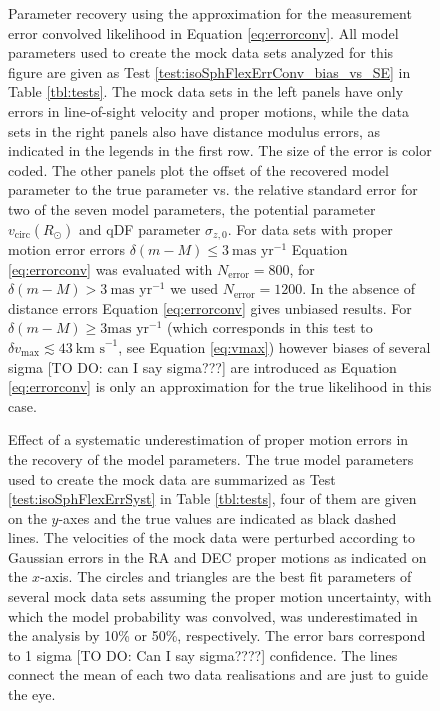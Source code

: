 \begin{figure}
\caption{Parameter recovery using the approximation for the measurement error convolved likelihood in Equation \ref{eq:errorconv}. All model parameters used to create the mock data sets analyzed for this figure are given as Test \ref{test:isoSphFlexErrConv_bias_vs_SE} in Table \ref{tbl:tests}. The mock data sets in the left panels have only errors in line-of-sight velocity and proper motions, while the data sets in the right panels also have distance modulus errors, as indicated in the legends in the first row. The size of the error is color coded. The other panels plot the offset of the recovered model parameter to the true parameter vs. the relative standard error for two of the seven model parameters, the potential parameter $v_\text{circ}(R_\odot)$ and qDF parameter $\sigma_{z,0}$. For data sets with proper motion error errors $\delta(m-M) \leq 3 \ \text{mas yr}^{-1}$ Equation \ref{eq:errorconv} was evaluated with $N_\text{error}=800$, for $\delta(m-M) > 3 \ \text{mas yr}^{-1}$ we used $N_\text{error}=1200$. In the absence of distance errors Equation \ref{eq:errorconv} gives unbiased results. For $\delta(m-M) \geq 3 \text{mas yr}^{-1}$ (which corresponds in this test to $\delta v_\text{max} \lesssim 43 \ \text{km s}^{-1}$, see Equation \ref{eq:vmax}) however biases of several sigma [TO DO: can I say sigma???] are introduced as Equation \ref{eq:errorconv} is only an approximation for the true likelihood in this case. }
\label{fig:isoSphFlexErrConv_bias_vs_SE}
\end{figure}





\begin{figure}
\caption{Effect of a systematic underestimation of proper motion errors in the recovery of the model parameters. The true model parameters used to create the mock data are summarized as Test \ref{test:isoSphFlexErrSyst} in Table \ref{tbl:tests}, four of them are given on the $y$-axes and the true values are indicated as black dashed lines. The velocities of the mock data were perturbed according to Gaussian errors in the RA and DEC proper motions as indicated on the $x$-axis. The circles and triangles are the best fit parameters of several mock data sets assuming the proper motion uncertainty, with which the model probability was convolved, was underestimated in the analysis by 10\% or 50\%, respectively. The error bars correspond to 1 sigma [TO DO: Can I say sigma????] confidence. The lines connect the mean of each two data realisations and are just to guide the eye. }
\label{fig:isoSphFlexErrSyst}
\end{figure}


